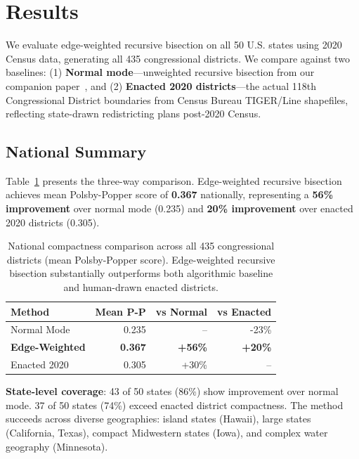 \section{Results}

We evaluate edge-weighted recursive bisection on all 50 U.S. states using 2020 Census data, generating all 435 congressional districts. We compare against two baselines: (1) \textbf{Normal mode}—unweighted recursive bisection from our companion paper~\cite{dellaLibera2026recursive}, and (2) \textbf{Enacted 2020 districts}—the actual 118th Congressional District boundaries from Census Bureau TIGER/Line shapefiles, reflecting state-drawn redistricting plans post-2020 Census.

\subsection{National Summary}

Table~\ref{tab:national-summary} presents the three-way comparison. Edge-weighted recursive bisection achieves mean Polsby-Popper score of \textbf{0.367} nationally, representing a \textbf{56\% improvement} over normal mode (0.235) and \textbf{20\% improvement} over enacted 2020 districts (0.305).

\begin{table}[h]
\centering
\begin{tabular}{lrrr}
\toprule
\textbf{Method} & \textbf{Mean P-P} & \textbf{vs Normal} & \textbf{vs Enacted} \\
\midrule
Normal Mode & 0.235 & -- & -23\% \\
\textbf{Edge-Weighted} & \textbf{0.367} & \textbf{+56\%} & \textbf{+20\%} \\
Enacted 2020 & 0.305 & +30\% & -- \\
\bottomrule
\end{tabular}
\caption{National compactness comparison across all 435 congressional districts (mean Polsby-Popper score). Edge-weighted recursive bisection substantially outperforms both algorithmic baseline and human-drawn enacted districts.}
\label{tab:national-summary}
\end{table}

\textbf{State-level coverage}: 43 of 50 states (86\%) show improvement over normal mode. 37 of 50 states (74\%) exceed enacted district compactness. The method succeeds across diverse geographies: island states (Hawaii), large states (California, Texas), compact Midwestern states (Iowa), and complex water geography (Minnesota).

